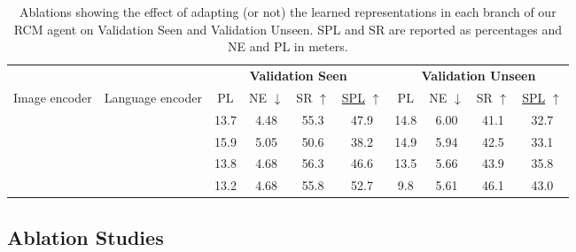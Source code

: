 \documentclass[10pt,twocolumn,letterpaper]{article}
\newcommand{\cmark}{\ding{51}}\newcommand{\xmark}{\ding{55}}\newcommand{\taskcma}{\textsc{cma}}
\begin{document}
\begin{table*}
\centering
\setlength\tabcolsep{4.5pt}
\begin{tabular}{cccccccccc} \\[-0.8em]
                              &  & \multicolumn{4}{c}{\textbf{Validation Seen}} & \multicolumn{4}{c}{\textbf{Validation Unseen}}\\\cmidrule(lr{0.1cm}){3-6}\cmidrule(l{0.1cm}){7-10}
Image encoder & Language encoder                    & PL    & NE $\downarrow$   & SR $\uparrow$   & \underline{SPL} $\uparrow$  & PL    & NE $\downarrow$   & SR $\uparrow$   & \underline{SPL} $\uparrow$   \\[0.2em]\Xhline{2\arrayrulewidth}
\xmark        & \xmark           & 13.7 & 4.48           & 55.3          & 47.9           & 14.8 & 6.00           & 41.1         & 32.7 \\
\cmark        & \xmark           & 15.9   & 5.05               & 50.6             & 38.2              & 14.9 & 5.94          & 42.5         & 33.1 \\
\xmark        & \cmark           & 13.8   & 4.68               & 56.3             & 46.6              & 13.5 & 5.66          & 43.9         & 35.8 \\
\cmark        & \cmark           & 13.2 & 4.68           & 55.8          & 52.7           & 9.8  & 5.61           & 46.1         & 43.0  \\

\end{tabular}
\caption{Ablations showing the effect of adapting (or not) the learned representations in each branch of our RCM agent on Validation Seen and Validation Unseen. SPL and SR are reported as percentages and NE and PL in meters.}
\label{tab:encoder-ablation}
\end{table*}


\subsection{Ablation Studies}
\end{document}
